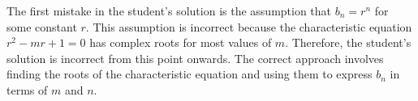 The first mistake in the student's solution is the assumption that $b_n = r^n$ for some constant $r$. This assumption is incorrect because the characteristic equation $r^2 - mr + 1 = 0$ has complex roots for most values of $m$. Therefore, the student's solution is incorrect from this point onwards. The correct approach involves finding the roots of the characteristic equation and using them to express $b_n$ in terms of $m$ and $n$.
